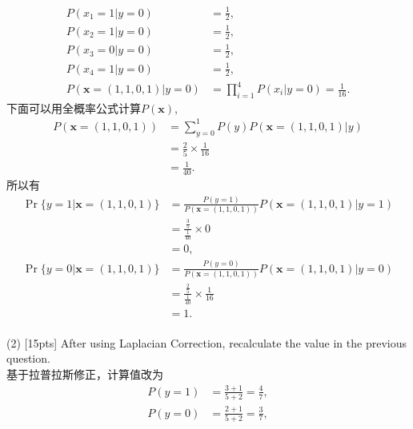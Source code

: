 \documentclass{article}
\begin{document}
        \begin{align}
            P(x_1 = 1 \left| y = 0 \right.) &= \frac{1}{2},\\
            P(x_2 = 1 \left| y = 0 \right.) &= \frac{1}{2},\\
            P(x_3 = 0 \left| y = 0 \right.) &= \frac{1}{2},\\
            P(x_4 = 1 \left| y = 0 \right.) &= \frac{1}{2},\\
            P(\boldsymbol{x} = (1,1,0,1) \left| y=0 \right.) &= \prod_{i=1}^4 P(x_i \left| y=0 \right.) = \frac{1}{16}.
        \end{align}
        下面可以用全概率公式计算$P(\boldsymbol{x})$,
        \begin{equation}
            \begin{aligned}
                P(\boldsymbol{x} = (1,1,0,1)) &= \sum_{y = 0}^1 P(y) P(\boldsymbol{x} = (1,1,0,1) \left| y \right.)\\
                        &= \frac{2}{5} \times \frac{1}{16}\\
                        &= \frac{1}{40}.
            \end{aligned}
        \end{equation}
        所以有
        \begin{align}
            \Pr\{ y=1 | \mathbf{x}=(1,1,0,1) \} &= \frac{P(y=1)}{P(\boldsymbol{x} = (1,1,0,1))} P(\boldsymbol{x}=(1,1,0,1) \left| y=1 \right.)\\
                                                &= \frac{\frac{3}{5}}{\frac{1}{40}} \times 0\\
                                                &= 0,\\
            \Pr\{ y=0 | \mathbf{x}=(1,1,0,1) \} &= \frac{P(y=0)}{P(\boldsymbol{x} = (1,1,0,1))} P(\boldsymbol{x}=(1,1,0,1) \left| y=0 \right.)\\
                                                &= \frac{\frac{2}{5}}{\frac{1}{40}} \times \frac{1}{16}\\
                                                &= 1.
        \end{align}
        \\
        (2) [15pts] After using Laplacian Correction, recalculate the value in the previous question.\\
        基于拉普拉斯修正，计算值改为
        \begin{align}
            P(y = 1) &= \frac{3+1}{5+2} = \frac{4}{7},\\
            P(y = 0) &= \frac{2+1}{5+2} = \frac{3}{7},
        \end{align}
\end{document}
